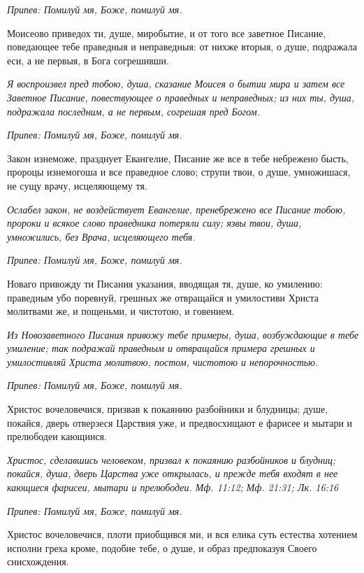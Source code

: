 \itshape Припев:\normalfont{} Помилуй мя, Боже, помилуй мя.


Моисеово приведох ти, душе, миробытие, и от того все заветное Писание, поведающее тебе праведныя и неправедныя: от нихже вторыя, о душе, подражала еси, а не первыя, в Бога согрешивши.


\itshape Я воспроизвел пред тобою, душа, сказание Моисея о бытии мира и затем все Заветное Писание, повествующее о праведных и неправедных; из них ты, душа, подражала последним, а не первым, согрешая пред Богом.\normalfont{}


\itshape Припев:\normalfont{} Помилуй мя, Боже, помилуй мя.


Закон изнеможе, празднует Евангелие, Писание же все в тебе небрежено бысть, пророцы изнемогоша и все праведное слово; струпи твои, о душе, умножишася, не сущу врачу, исцеляющему тя.


\itshape Ослабел закон, не воздействует Евангелие, пренебрежено все Писание тобою, пророки и всякое слово праведника потеряли силу; язвы твои, душа, умножились, без Врача, исцеляющего тебя.\normalfont{}


\itshape Припев:\normalfont{} Помилуй мя, Боже, помилуй мя.


Новаго привожду ти Писания указания, вводящая тя, душе, ко умилению: праведным убо поревнуй, грешных же отвращайся и умилостиви Христа молитвами же, и пощеньми, и чистотою, и говением.


\itshape Из Новозаветного Писания привожу тебе примеры, душа, возбуждающие в тебе умиление; так подражай праведным и отвращайся примера грешных и умилостивляй Христа молитвою, постом, чистотою и непорочностью.\normalfont{}


\itshape Припев:\normalfont{} Помилуй мя, Боже, помилуй мя.


Христос вочеловечися, призвав к покаянию разбойники и блудницы; душе, покайся, дверь отверзеся Царствия уже, и предвосхищают е фарисее и мытари и прелюбодеи кающиися.


\itshape Христос, сделавшись человеком, призвал к покаянию разбойников и блудниц; покайся, душа, дверь Царства уже открылась, и прежде тебя входят в нее кающиеся фарисеи, мытари и прелюбодеи. Мф. 11:12; Мф. 21:31; Лк. 16:16\normalfont{}


\itshape Припев:\normalfont{} Помилуй мя, Боже, помилуй мя.


Христос вочеловечися, плоти приобщився ми, и вся елика суть естества хотением исполни греха кроме, подобие тебе, о душе, и образ предпоказуя Своего снисхождения.


